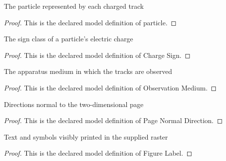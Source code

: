 \begin{definition}[particle]
  \label{def:physics:phyx-mini-0540:phyxminiproblems-problemphyxmini0540-chargedtrack-particle}
  The particle represented by each charged track
\end{definition}
\begin{proof}
  This is the declared model definition of particle.
\end{proof}
\begin{definition}
  \label{def:physics:phyx-mini-0540:phyxminiproblems-problemphyxmini0540-chargesign}
  The sign class of a particle's electric charge
\end{definition}
\begin{proof}
  This is the declared model definition of Charge Sign.
\end{proof}
\begin{definition}
  \label{def:physics:phyx-mini-0540:phyxminiproblems-problemphyxmini0540-observationmedium}
  The apparatus medium in which the tracks are observed
\end{definition}
\begin{proof}
  This is the declared model definition of Observation Medium.
\end{proof}
\begin{definition}
  \label{def:physics:phyx-mini-0540:phyxminiproblems-problemphyxmini0540-pagenormaldirection}
  Directions normal to the two-dimensional page
\end{definition}
\begin{proof}
  This is the declared model definition of Page Normal Direction.
\end{proof}
\begin{definition}
  \label{def:physics:phyx-mini-0540:phyxminiproblems-problemphyxmini0540-figurelabel}
  Text and symbols visibly printed in the supplied raster
\end{definition}
\begin{proof}
  This is the declared model definition of Figure Label.
\end{proof}
